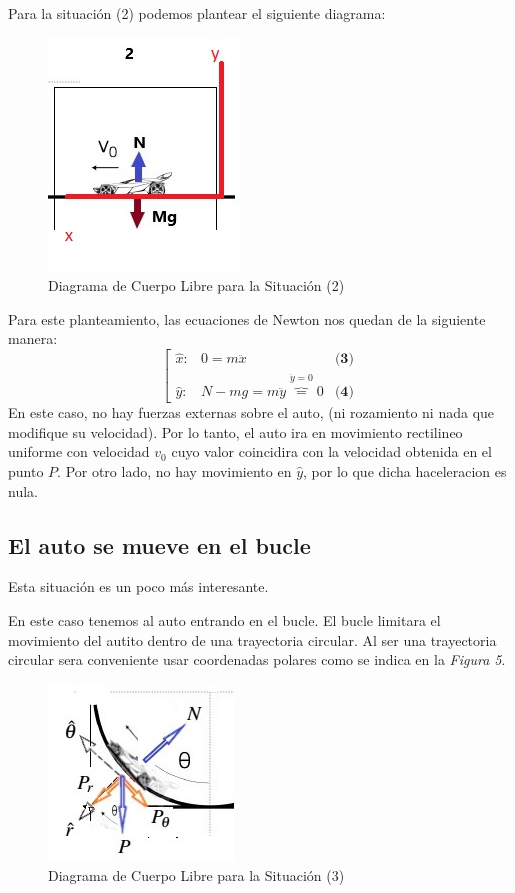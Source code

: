 \documentclass[fleqn,10pt]{SelfArx} %
\begin{document}
Para la situación (2) podemos plantear el siguiente diagrama:  
\begin{figure}[h] 
	\centering
	\includegraphics[scale=0.6]{figuras/diag2.jpg}
	\caption{Diagrama de Cuerpo Libre para la Situación (2)}
	\label{fig:4}
\end{figure}
Para este planteamiento, las ecuaciones de Newton nos quedan de la siguiente manera:
\[\left[ \begin{array}{lll}
 \hat{x}: & 0 = m \ddot{x} & \textbf{(3)}\\
 \hat{y}: &N - m g = m \ddot{y} \overbrace{=}^{\ddot{y}=0} 0 & \textbf{(4)}
\end{array} \right.
\]
En este caso, no hay fuerzas externas sobre el auto, (ni rozamiento ni nada que modifique su velocidad). Por lo tanto, el auto ira en movimiento rectilineo uniforme con velocidad $v_0$ cuyo valor coincidira con la velocidad obtenida en el punto $P$. Por otro lado, no hay movimiento en $\hat{y}$, por lo que dicha haceleracion es nula. 

\subsection*{El auto se mueve en el bucle}

Esta situación es un poco más interesante.

En este caso tenemos al auto entrando en el bucle. El bucle limitara el movimiento del autito dentro de una trayectoria circular. Al ser una trayectoria circular sera conveniente usar coordenadas polares como se indica en la \textit{Figura 5}. 
\begin{figure}[h] 
	\centering
	\includegraphics[scale=0.7]{figuras/diag3.jpg}
	\caption{Diagrama de Cuerpo Libre para la Situación (3)}
	\label{fig:5}
\end{figure}
\end{document}
